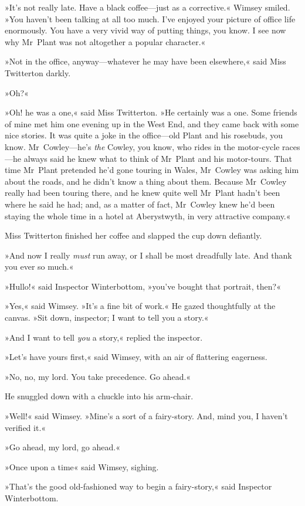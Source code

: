 »It's not really late. Have a black coffee—just as a corrective.« Wimsey smiled. »You haven't been talking at all too much. I've enjoyed your picture of office life enormously. You have a very vivid way of putting things, you know. I see now why Mr~Plant was not altogether a popular character.«

»Not in the office, anyway—whatever he may have been elsewhere,« said Miss Twitterton darkly.

»Oh?«

»Oh! he was a one,« said Miss Twitterton. »He certainly was a one. Some friends of mine met him one evening up in the West End, and they came back with some nice stories. It was quite a joke in the office—old Plant and his rosebuds, you know. Mr~Cowley—he's \textit{the} Cowley, you know, who rides in the motor-cycle races—he always said he knew what to think of Mr~Plant and his motor-tours. That time Mr~Plant pretended he'd gone touring in Wales, Mr~Cowley was asking him about the roads, and he didn't know a thing about them. Because Mr~Cowley really had been touring there, and he knew quite well Mr~Plant hadn't been where he said he had; and, as a matter of fact, Mr~Cowley knew he'd been staying the whole time in a hotel at Aberystwyth, in very attractive company.«

Miss Twitterton finished her coffee and slapped the cup down defiantly.

»And now I really \textit{must} run away, or I shall be most dreadfully late. And thank you ever so much.«

»Hullo!« said Inspector Winterbottom, »you've bought that portrait, then?«

»Yes,« said Wimsey. »It's a fine bit of work.« He gazed thoughtfully at the canvas. »Sit down, inspector; I want to tell you a story.«

»And I want to tell \textit{you} a story,« replied the inspector.

»Let's have yours first,« said Wimsey, with an air of flattering eagerness.

»No, no, my lord. You take precedence. Go ahead.«

He snuggled down with a chuckle into his arm-chair.

»Well!« said Wimsey. »Mine's a sort of a fairy-story. And, mind you, I haven't verified it.«

»Go ahead, my lord, go ahead.«

»Once upon a time\longdash« said Wimsey, sighing.

»That's the good old-fashioned way to begin a fairy-story,« said Inspector Winterbottom.

